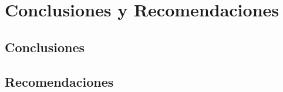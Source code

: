 \documentclass[main]{subfiles}
\begin{document}
\chapter{Conclusiones y Recomendaciones}

\section{Conclusiones}
\section{Recomendaciones}
\end{document}

